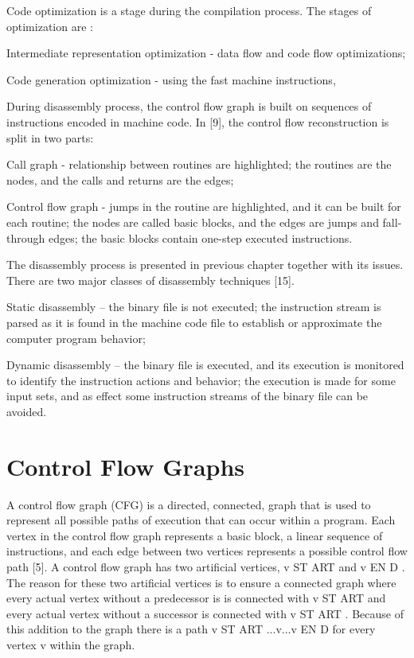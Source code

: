 Code optimization is a stage during the compilation process. The stages of optimization are :

Intermediate representation optimization - data flow and code flow optimizations;

Code generation optimization - using the fast machine instructions,

During disassembly process, the control flow graph is built on sequences of 
instructions encoded in machine code. In [9], the control flow reconstruction is split in two parts:

Call graph - relationship between routines are highlighted; the routines are the nodes, and the calls and returns are the edges;

Control flow graph - jumps in the routine are highlighted, and it can be built for each routine; the nodes are called basic blocks, and the edges are jumps and fall-through edges; the basic blocks contain one-step executed instructions.

The disassembly process is presented in previous chapter together with its issues. There are two major classes of disassembly techniques [15].

Static disassembly – the binary file is not executed; the instruction stream is parsed as it is found in the machine code file to establish or approximate the computer program behavior;

Dynamic disassembly – the binary file is executed, and its execution is monitored to identify the instruction actions and behavior; the execution is made for some input sets, and as effect some instruction streams of the binary file can be avoided.


\section{Control Flow Graphs}

A control flow graph (CFG) is a directed, connected, graph that is used to represent all possible paths of execution that can occur within a program. Each vertex in the control flow graph represents a basic block, a linear sequence of instructions, and each edge between two vertices represents a possible control flow path [5]. A control flow graph has two artificial vertices, v ST ART and v EN D . The reason for these two artificial vertices is to ensure a connected graph where
every actual vertex without a predecessor is is connected with v ST ART and every actual vertex without a successor is connected with v ST ART . Because of this addition to the graph there is a path v ST ART ...v...v EN D for every vertex v within the graph.

